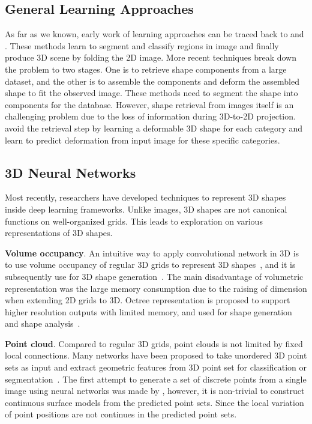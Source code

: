 \subsection{General Learning Approaches}
As far as we known, early work of learning approaches can be traced back to \cite{Hoiem2007} and \cite{learn3D2007}. These methods learn to segment and classify regions in image and finally produce 3D scene by folding the 2D image.
%
More recent techniques break down the problem to two stages\cite{Su:2014,jointimgshape}. One is to retrieve shape components from a large dataset, and the other is to assemble the components and deform the assembled shape to fit the observed image. These methods need to segment the shape into components for the database.
%
However, shape retrieval from images itself is an challenging problem due to the loss of information during 3D-to-2D projection. 
\cite{imgrecon15} avoid the retrieval step by learning a deformable 3D shape for each category and learn to predict deformation from input image for these specific categories.
%
\subsection{3D Neural Networks}
Most recently, researchers have developed techniques to represent 3D shapes inside deep learning frameworks. Unlike images, 3D shapes are not canonical functions on well-organized grids.
This leads to exploration on various representations of 3D shapes.

\noindent\textbf{Volume occupancy}. 
An intuitive way to apply convolutional network in 3D is to use volume occupancy of regular 3D grids to represent 3D shapes~\cite{3dshapenet}, and it is subsequently use for 3D shape generation~\cite{3DR2N2,learnobj}.
%
The main disadvantage of volumetric representation was the large memory consumption due to the raising of dimension when extending 2D grids to 3D. 
Octree representation is proposed to support higher resolution outputs with limited memory, and used for shape generation~\cite{octreegen} and shape analysis~\cite{ocnn}.

\noindent\textbf{Point cloud}. 
Compared to regular 3D grids, point clouds is not limited by fixed local connections.
Many networks have been proposed to take unordered 3D point sets as input and extract geometric features from 3D point set for classification or segmentation~\cite{pointnet,NIPS2017_7095,pointcnn}.
%
The first attempt to generate a set of discrete points from a single image using neural networks was made by \cite{PSGN}, however, it is non-trivial to construct continuous surface models from the predicted point sets. Since the local variation of point positions are not continues in the predicted point sets.

